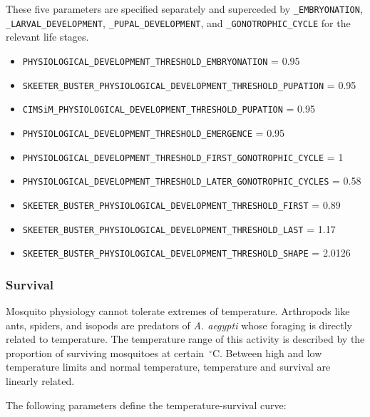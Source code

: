 \documentclass[11pt]{article}
\newcommand{\linecmd}[1]{\texttt{#1}}
\begin{document}
These five parameters are specified separately and superceded by \linecmd{\_EMBRYONATION}, \linecmd{\_LARVAL\_DEVELOPMENT}, \linecmd{\_PUPAL\_DEVELOPMENT}, and \linecmd{\_GONOTROPHIC\_CYCLE} for the relevant life stages.

\begin{itemize}
	\item \linecmd{PHYSIOLOGICAL\_DEVELOPMENT\_THRESHOLD\_EMBRYONATION} = 0.95
	\item \linecmd{SKEETER\_BUSTER\_PHYSIOLOGICAL\_DEVELOPMENT\_THRESHOLD\_PUPATION} = 0.95
	\item \linecmd{CIMSiM\_PHYSIOLOGICAL\_DEVELOPMENT\_THRESHOLD\_PUPATION} = 0.95
	\item \linecmd{PHYSIOLOGICAL\_DEVELOPMENT\_THRESHOLD\_EMERGENCE} = 0.95
	\item \linecmd{PHYSIOLOGICAL\_DEVELOPMENT\_THRESHOLD\_FIRST\_GONOTROPHIC\_CYCLE} = 1
	\item \linecmd{PHYSIOLOGICAL\_DEVELOPMENT\_THRESHOLD\_LATER\_GONOTROPHIC\_CYCLES} = 0.58
	\item \linecmd{SKEETER\_BUSTER\_PHYSIOLOGICAL\_DEVELOPMENT\_THRESHOLD\_FIRST} = 0.89
	\item \linecmd{SKEETER\_BUSTER\_PHYSIOLOGICAL\_DEVELOPMENT\_THRESHOLD\_LAST} = 1.17
	\item \linecmd{SKEETER\_BUSTER\_PHYSIOLOGICAL\_DEVELOPMENT\_THRESHOLD\_SHAPE} = 2.0126
\end{itemize}

\subsubsection{Survival}

Mosquito physiology cannot tolerate extremes of temperature. Arthropods like ants, spiders, and isopods are predators of \emph{A. aegypti} whose foraging is directly related to temperature. The temperature range of this activity is described by the proportion of surviving mosquitoes at certain $\,^{\circ}\mathrm{C}$. Between high and low temperature limits and normal temperature, temperature and survival are linearly related.


The following parameters define the temperature-survival curve:\label{tempsurv}
\end{document}
